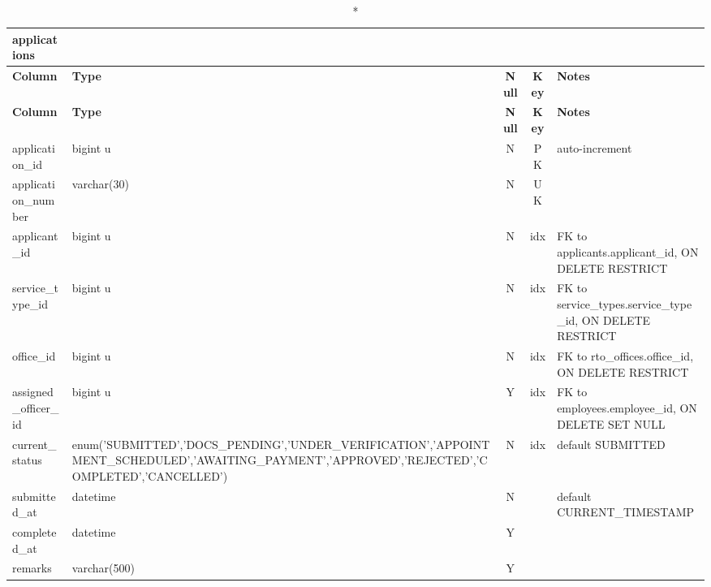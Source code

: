 \begin{longtable}{@{}p{3.4cm}p{2.9cm}c c p{5.6cm}@{}}
\caption*{\textbf{applications}}\\
\toprule \textbf{Column} & \textbf{Type} & \textbf{Null} & \textbf{Key} & \textbf{Notes} \\ \midrule \endfirsthead
\toprule \textbf{Column} & \textbf{Type} & \textbf{Null} & \textbf{Key} & \textbf{Notes} \\ \midrule \endhead
\bottomrule \endlastfoot
application\_\allowbreak{}id & bigint u & N & PK & auto-increment \\
application\_\allowbreak{}number & varchar(30) & N & UK &  \\
applicant\_\allowbreak{}id & bigint u & N & idx & FK to applicants.applicant\_\allowbreak{}id, ON DELETE RESTRICT \\
service\_\allowbreak{}type\_\allowbreak{}id & bigint u & N & idx & FK to service\_\allowbreak{}types.service\_\allowbreak{}type\_\allowbreak{}id, ON DELETE RESTRICT \\
office\_\allowbreak{}id & bigint u & N & idx & FK to rto\_\allowbreak{}offices.office\_\allowbreak{}id, ON DELETE RESTRICT \\
assigned\_\allowbreak{}officer\_\allowbreak{}id & bigint u & Y & idx & FK to employees.employee\_\allowbreak{}id, ON DELETE SET NULL \\
current\_\allowbreak{}status & enum('SUBMITTED',\allowbreak{}'DOCS\_\allowbreak{}PENDING',\allowbreak{}'UNDER\_\allowbreak{}VERIFICATION',\allowbreak{}'APPOINTMENT\_\allowbreak{}SCHEDULED',\allowbreak{}'AWAITING\_\allowbreak{}PAYMENT',\allowbreak{}'APPROVED',\allowbreak{}'REJECTED',\allowbreak{}'COMPLETED',\allowbreak{}'CANCELLED') & N & idx & default SUBMITTED \\
submitted\_\allowbreak{}at & datetime & N &  & default CURRENT\_\allowbreak{}TIMESTAMP \\
completed\_\allowbreak{}at & datetime & Y &  &  \\
remarks & varchar(500) & Y &  &  \\
\end{longtable}
\vspace{-0.4em}
